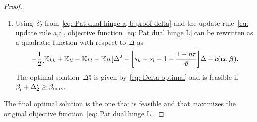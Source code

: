 \begin{proof}
\begin{enumerate}
    \item Using~$\delta^{\star}_2$ from~\eqref{eq: Pat dual hinge a, b proof delta} and the update rule~\eqref{eq: update rule a,a}, objective function~\eqref{eq: Pat dual hinge L} can be rewritten as a quadratic function with respect to~$\Delta$ as
    \begin{equation*}
      - \frac{1}{2} \Brac[s]{\K_{kk} + \K_{ll} - \K_{kl} - \K_{lk}} \Delta^2
      - \Brac[s]{s_k - s_l - 1 - \frac{1 - \ntil \tau}{\vartheta}} \Delta
      - c(\bm{\alpha}, \bm{\beta}).
    \end{equation*}
    The optimal solution~$\Delta^{\star}_2$ is given by~\eqref{eq: Delta optimal} and is feasible if~$\beta_{\hat{l}} + \Delta^{\star}_2 \geq \beta_{\max}$.
  \end{enumerate}
  The final optimal solution is the one that is feasible and that maximizes the original objective function~\eqref{eq: Pat dual hinge L}.
\end{proof}



